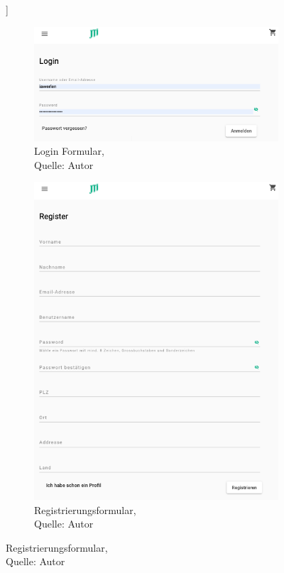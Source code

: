 \begin{figure}[H]]
 	\begin{subfigure}[b]{0.4\textwidth}
 		\includegraphics[scale=0.3]{images/loginForm.PNG}
 		\caption[Login Formular]{Login Formular,\\ Quelle: Autor}
 		\label{img: loginForm}
 	\end{subfigure}
 	\hfill
 	\begin{subfigure}[b]{0.4\textwidth}
 		\includegraphics[scale=0.3]{images/registerForm.PNG}
 		\caption[Registrierungsformular]{Registrierungsformular,\\ Quelle: Autor}
 		\label{img: registerForm}
 	\end{subfigure}
\end{figure} 
 

